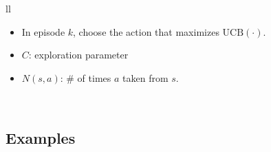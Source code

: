 \begin{notes}
\begin{center}
\begin{tabular}{ll}
            {
                \begin{itemize}
                    \item In episode $k$, choose the action that maximizes $\text{UCB}(\cdot)$.
                    \item $C$: exploration parameter
                    \item $N(s,a)$: \# of times $a$ taken from $s$. 
                \end{itemize}
            } \\
            \bottomrule
        \end{tabular}
    \end{center}
\end{notes}
\newpage

\subsection{Examples}
